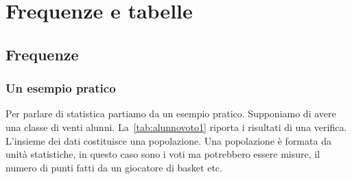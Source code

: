 \chapter{Frequenze e tabelle}
\label{cha:frequenzeTabelle}
\section{Frequenze}
\label{sec:Frequenze}
\subsection{Un esempio pratico}
\label{sec:Un esempioPratico}
Per parlare di statistica partiamo da un esempio pratico. Supponiamo di avere una classe di venti alunni. La~\vref{tab:alunnovoto1} riporta i risultati di una verifica. L'insieme dei dati costituisce una popolazione. Una popolazione è formata da unità statistiche, in questo caso sono i voti ma potrebbero essere misure, il numero di punti fatti da un giocatore di basket etc.   

